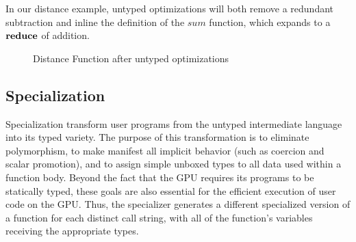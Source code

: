 \documentclass[10pt,twocolumn]{article}
\begin{document}
In our distance example, untyped optimizations will both remove a redundant subtraction and inline the definition of the $sum$ function, which expands to a $\mbox{\textbf{reduce}}$ of addition.
\begin{figure}[h!]
\caption{Distance Function after untyped optimizations}
\end{figure}

\subsection{Specialization}
Specialization transform user programs from the untyped intermediate language into its typed variety. The purpose of this transformation is to eliminate polymorphism, to make manifest all implicit behavior (such as coercion and scalar promotion), and to assign simple unboxed types to all data used within a function body. Beyond the fact that the GPU requires its programs to be statically typed, these goals are also essential for the efficient execution of user code on the GPU. Thus, the specializer generates a different specialized version of a function for each distinct call string, with all of the function's variables receiving the appropriate types.
\end{document}
